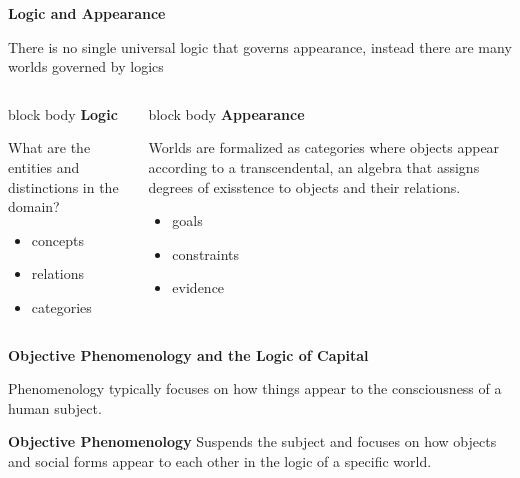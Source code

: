 \documentclass[aspectratio=169]{beamer}
\newcommand{\slideheading}[1]{%
    {\small\bfseries\color{slideMuted}#1\par}
    \vspace{1em}
}
\begin{document}
\begin{frame}
    \slideheading{Logic and Appearance}
    There is no single universal logic that governs appearance, instead there are many worlds governed by logics
    \vspace{0.4em}
    \begin{columns}[T,onlytextwidth]
        \begin{beamercolorbox}[wd=\linewidth,sep=0pt]{block body}
            {\large\bfseries\color{slideBlue}Logic}\par
            \vspace{0.5em}
            What are the entities and distinctions in the domain?
            \begin{itemize}
                \item concepts
                \item relations
                \item categories
            \end{itemize}
        \end{beamercolorbox}
        \begin{beamercolorbox}[wd=\linewidth,sep=0pt]{block body}
            {\large\bfseries\color{slideBlue}Appearance}\par
            \vspace{0.5em}
            Worlds are formalized as categories where objects appear according to a transcendental, an algebra that assigns degrees of exisstence to objects and their relations. 
            \begin{itemize}
                \item goals
                \item constraints
                \item evidence
            \end{itemize}
        \end{beamercolorbox}
    \end{columns}
\end{frame}

\begin{frame}
	\slideheading{Objective Phenomenology and the Logic of Capital}
	Phenomenology typically focuses on how things appear to the consciousness of a human subject.\par
	\vspace{0.8em}
	\textbf{Objective Phenomenology} Suspends the subject and focuses on how objects and social forms appear to each other in the logic of a specific world.
\end{frame}
\end{document}
